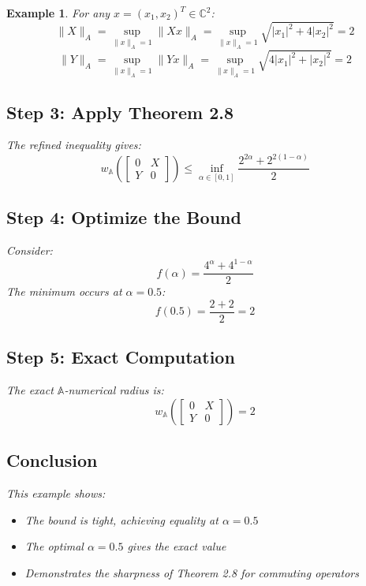 \documentclass{article}
\newtheorem{example}[theorem]{Example}
\begin{document}
\begin{example}
For any $x = (x_1,x_2)^T \in \mathbb{C}^2$:
\[
\|X\|_A = \sup_{\|x\|_A=1} \|Xx\|_A = \sup_{\|x\|_A=1} \sqrt{|x_1|^2 + 4|x_2|^2} = 2
\]
\[
\|Y\|_A = \sup_{\|x\|_A=1} \|Yx\|_A = \sup_{\|x\|_A=1} \sqrt{4|x_1|^2 + |x_2|^2} = 2
\]

\subsection*{Step 3: Apply Theorem 2.8}

The refined inequality gives:
\[
w_{\mathbb{A}}\left(\begin{bmatrix} 0 & X \\ Y & 0 \end{bmatrix}\right) \leq \inf_{\alpha \in [0,1]} \frac{2^{2\alpha} + 2^{2(1-\alpha)}}{2}
\]

\subsection*{Step 4: Optimize the Bound}

Consider:
\[
f(\alpha) = \frac{4^\alpha + 4^{1-\alpha}}{2}
\]
The minimum occurs at $\alpha = 0.5$:
\[
f(0.5) = \frac{2 + 2}{2} = 2
\]

\subsection*{Step 5: Exact Computation}

The exact $\mathbb{A}$-numerical radius is:
\[
w_{\mathbb{A}}\left(\begin{bmatrix} 0 & X \\ Y & 0 \end{bmatrix}\right) = 2
\]

\subsection*{Conclusion}

This example shows:
\begin{itemize}
\item The bound is tight, achieving equality at $\alpha = 0.5$
\item The optimal $\alpha = 0.5$ gives the exact value
\item Demonstrates the sharpness of Theorem 2.8 for commuting operators
\end{itemize}
\end{example}
\end{document}
